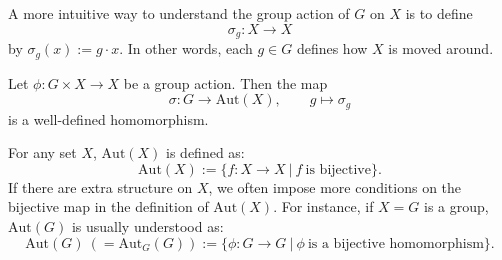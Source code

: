 A more intuitive way to understand the group action of $G$ on $X$ is to define 
$$\sigma_g: X \to X$$ 
by $\sigma_g(x) := g \cdot x.$ In other words, each $g \in G$ defines how $X$ is moved around.
\begin{proposition}
Let $\phi: G \times X \to X$ be a group action. Then the map
$$\sigma : G \to \mathrm{Aut}(X), \quad \quad g \mapsto \sigma_g$$
is a well-defined homomorphism.
\end{proposition}
\begin{remark}
For any set $X$, $\mathrm{Aut}(X)$ is defined as:
$$\mathrm{Aut}(X) := \{ f: X \to X\ |\ f\ \text{is bijective}\}.$$
If there are extra structure on $X$, we often impose more conditions on the bijective map in the definition of $\mathrm{Aut}(X)$. For instance, if $X = G$ is a group, $\mathrm{Aut}(G)$ is usually understood as:
$$\mathrm{Aut}(G)\ (= \mathrm{Aut}_G(G)) := \{ \phi: G \to G\ |\ \phi \ \text{is a bijective homomorphism}\}.$$
\end{remark}

